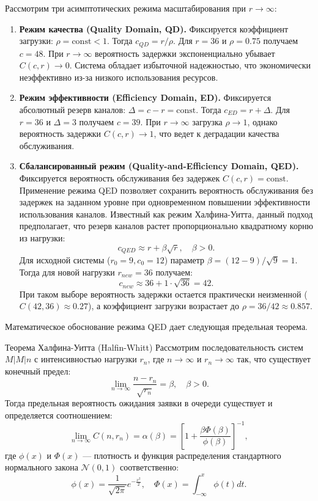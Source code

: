 \begin{eproof}
Рассмотрим три асимптотических режима масштабирования при $r \to \infty$:

\begin{enumerate}
    \item \textbf{Режим качества (Quality Domain, QD).} 
    Фиксируется коэффициент загрузки: $\rho = \text{const} < 1$. Тогда $c_{QD} = r/\rho$. Для $r=36$ и $\rho=0.75$ получаем $c = 48$. При $r \to \infty$ вероятность задержки экспоненциально убывает $C(c, r) \to 0$. Система обладает избыточной надежностью, что экономически неэффективно из-за низкого использования ресурсов.

    \item \textbf{Режим эффективности (Efficiency Domain, ED).}
    Фиксируется абсолютный резерв каналов: $\Delta = c - r = \text{const}$. Тогда $c_{ED} = r + \Delta$. Для $r=36$ и $\Delta = 3$ получаем $c = 39$. При $r \to \infty$ загрузка $\rho \to 1$, однако вероятность задержки $C(c, r) \to 1$, что ведет к деградации качества обслуживания.

    \item \textbf{Сбалансированный режим (Quality-and-Efficiency Domain, QED).}
    Фиксируется вероятность обслуживания без задержек $C(c, r) = \text{const}$. Применение режима QED позволяет сохранить вероятность обслуживания без задержек на заданном уровне при одновременном повышении эффективности использования каналов. Известный как режим Халфина-Уитта, данный подход предполагает, что резерв каналов растет пропорционально квадратному корню из нагрузки:
    $$
    c_{QED} \approx r + \beta\sqrt{r}, \quad \beta > 0.
    $$
    Для исходной системы ($r_0=9, c_0=12$) параметр $\beta = (12 - 9)/\sqrt{9} = 1$. Тогда для новой нагрузки $r_{new}=36$ получаем:
    $$
    c_{new} \approx 36 + 1 \cdot \sqrt{36} = 42.
    $$
    При таком выборе вероятность задержки остается практически неизменной ($C(42, 36) \approx 0.27$), а коэффициент загрузки возрастает до $\rho = 36/42 \approx 0.857$.
\end{enumerate}
\end{eproof}

Математическое обоснование режима QED дает следующая предельная теорема.

\begin{theorem}{Теорема Халфина-Уитта (Halfin-Whitt)}
Рассмотрим последовательность систем $M|M|n$ с интенсивностью нагрузки $r_n$, где $n \to \infty$ и $r_n \to \infty$ так, что существует конечный предел:
$$
\lim_{n \to \infty} \frac{n - r_n}{\sqrt{r_n}} = \beta, \quad \beta > 0.
$$
Тогда предельная вероятность ожидания заявки в очереди существует и определяется соотношением:
$$
\lim_{n \to \infty} C(n, r_n) = \alpha(\beta) = \left[ 1 + \frac{\beta \Phi(\beta)}{\phi(\beta)} \right]^{-1},
$$
где $\phi(x)$ и $\Phi(x)$ — плотность и функция распределения стандартного нормального закона $\mathcal{N}(0,1)$ соответственно:
$$
\phi(x) = \frac{1}{\sqrt{2\pi}} e^{-\frac{x^2}{2}}, \quad \Phi(x) = \int_{-\infty}^{x} \phi(t) dt.
$$
\end{theorem}

